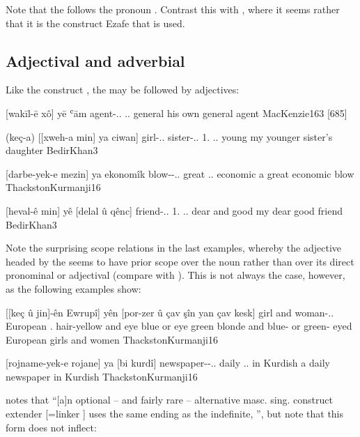 Note that the \lnk* \ez* follows the \obl* pronoun . Contrast this with , where it seems rather that it is the construct Ezafe that is used.

\subsection{Adjectival and adverbial \secns} \label{ss:kurd_lnk_adj}

Like the construct \ez*, the \lnk* \ez* may be followed by adjectives:

{[wakīl-ē xô] yē ʿām}
{agent-\ez..\masc{}  \lnk.\ez.\masc{} general}
{his own general agent}
{MacKenzie}{163 {[685]}}

{(keç-a) [[xweh-a min] ya ciwan]}
{girl-\ez..\fem{} sister-\ez..\fem{} 1\sg.\obl{} \lnk.\ez.\fem{} young}
{my younger sister's daughter}
{BedirKhan}{3}

{[darbe-yek-e mezin] ya ekonomîk}
{blow-\indef-\ez.\indef.\fem{} great 
\lnk.\ez.\fem{} economic}
{a great economic blow}
{ThackstonKurmanji}{16}



{[heval-ê min] yê [delal û qênc]}
{friend-\ez..\masc{} 1\sg.\obl{} \lnk.\ez.\masc{} dear and good}
{my dear good friend}
{BedirKhan}{3}

Note the surprising scope relations in the last examples, whereby the \secn adjective headed by the \lnk* \ez* seems to have prior scope over the \prim noun rather than over its direct pronominal or adjectival \secn (compare with ). This is not always the case, however, as the following examples show:


{[[keç û jin]-ên Ewrupî] yên [por-zer û çav şîn yan çav kesk]}
{girl and woman-\ez..\pl{} European \ez.\pl{} hair-yellow and eye blue or eye green}
{blonde and blue- or green- eyed European girls and women}
{ThackstonKurmanji}{16}

{[rojname-yek-e rojane] ya [bi kurdî]}
{newspaper-\indef-\ez.\indef.\fem{} daily \lnk.\ez.\fem{} in Kurdish}
{a daily newspaper in Kurdish}
{ThackstonKurmanji}{16}


\citet[16]{ThackstonKurmanji} notes that \enquote{[a]n optional -- and fairly rare -- alternative masc. sing. construct extender [=linker \ez*] uses the same ending as the indefinite, }, but note that this form does not inflect:


